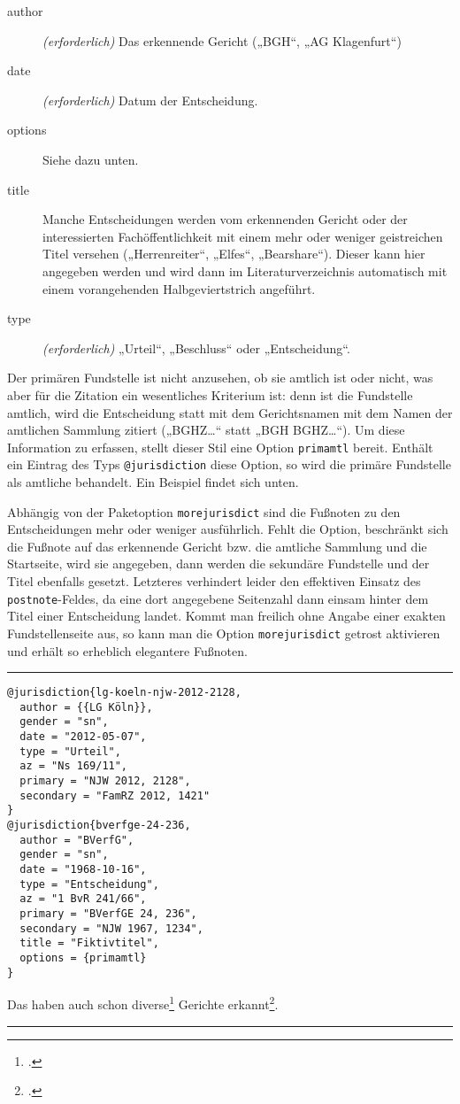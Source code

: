 \documentclass[11pt,a4paper,DIV=calc]{scrartcl}
\newenvironment{rubexample}{\par\vspace{\baselineskip}\hrule\par\begin{refsection}}{\end{refsection}\par\hrule\par\vspace{\baselineskip}}
\begin{document}
\begin{description}
\item[author] \emph{(erforderlich)} Das erkennende Gericht („BGH“, „AG Klagenfurt“)
\item[date] \emph{(erforderlich)} Datum der Entscheidung.
\item[options] Siehe dazu unten.
\item[title] Manche Entscheidungen werden vom erkennenden Gericht oder
  der interessierten Fachöffentlichkeit mit einem mehr oder weniger
  geistreichen Titel versehen („Herrenreiter“, „Elfes“,
  „Bearshare“). Dieser kann hier angegeben werden und wird dann im
  Literaturverzeichnis automatisch mit einem
  vorangehenden Halbgeviertstrich angeführt.
\item[type] \emph{(erforderlich)} „Urteil“, „Beschluss“ oder
  „Entscheidung“.
\end{description}

Der primären Fundstelle ist nicht anzusehen, ob sie amtlich ist oder
nicht, was aber für die Zitation ein wesentliches Kriterium ist: denn
ist die Fundstelle amtlich, wird die Entscheidung statt mit dem
Gerichtsnamen mit dem Namen der amtlichen Sammlung zitiert („BGHZ\ldots“
statt „BGH BGHZ\ldots“). Um diese Information zu erfassen, stellt
dieser Stil eine Option \verb+primamtl+ bereit. Enthält ein Eintrag
des Typs \verb+@jurisdiction+ diese Option, so wird die primäre
Fundstelle als amtliche behandelt. Ein Beispiel findet sich unten.

Abhängig von der Paketoption \verb+morejurisdict+ sind die Fußnoten zu
den Entscheidungen mehr oder weniger ausführlich. Fehlt die Option,
beschränkt sich die Fußnote auf das erkennende Gericht bzw. die
amtliche Sammlung und die Startseite, wird sie angegeben, dann werden
die sekundäre Fundstelle und der Titel ebenfalls gesetzt. Letzteres
verhindert leider den effektiven Einsatz des \verb+postnote+-Feldes,
da eine dort angegebene Seitenzahl dann einsam hinter dem Titel einer
Entscheidung landet. Kommt man freilich ohne Angabe einer exakten
Fundstellenseite aus, so kann man die Option \verb+morejurisdict+
getrost aktivieren und erhält so erheblich elegantere Fußnoten.

\begin{rubexample}
\begin{verbatim}
@jurisdiction{lg-koeln-njw-2012-2128,
  author = {{LG Köln}},
  gender = "sn",
  date = "2012-05-07",
  type = "Urteil",
  az = "Ns 169/11",
  primary = "NJW 2012, 2128",
  secondary = "FamRZ 2012, 1421"
}
@jurisdiction{bverfge-24-236,
  author = "BVerfG",
  gender = "sn",
  date = "1968-10-16",
  type = "Entscheidung",
  az = "1 BvR 241/66",
  primary = "BVerfGE 24, 236",
  secondary = "NJW 1967, 1234",
  title = "Fiktivtitel",
  options = {primamtl}
}
\end{verbatim}

Das haben auch schon diverse\footcite[2129]{lg-koeln-njw-2012-2128}
Gerichte erkannt\footcite{bverfge-24-236}.

\printbibliography
\end{rubexample}
\end{document}
